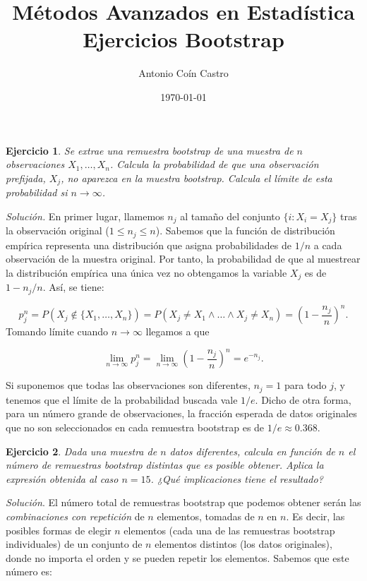 \documentclass[12pt]{article}
\title{Métodos Avanzados en Estadística \\ \Large{Ejercicios Bootstrap}}
\author{Antonio Coín Castro}
\date{\today}
\newtheorem{ejer}{Ejercicio}%
\begin{document}
\maketitle

\begin{ejer}
Se extrae una remuestra bootstrap de una muestra de $n$ observaciones $X_1,\dots,X_n$. Calcula la probabilidad de que una observación prefijada, $X_j$, no aparezca en la muestra bootstrap. Calcula el límite de esta probabilidad si $n\to \infty$.
\end{ejer}

\textit{Solución.} En primer lugar, llamemos $n_j$ al tamaño del conjunto $\{i: X_i = X_j\}$ tras la observación original ($1 \leq n_j \leq n$). Sabemos que la función de distribución empírica representa una distribución que asigna probabilidades de $1/n$ a cada observación de la muestra original. Por tanto, la probabilidad de que al muestrear la distribución empírica una única vez no obtengamos la variable $X_j$ es de $1- n_j/n$. Así, se tiene:

\[
p^n_j = P(X_j \notin \{X_1,\dots, X_n\}) = P(X_j \neq X_1 \land \dots \land X_j \neq X_n) = \left( 1 - \frac{n_j}{n}\right)^n.
\]
Tomando límite cuando $n\to\infty$ llegamos a que

\[
\lim_{n\to\infty} p^n_j = \lim_{n\to\infty}  \left( 1 - \frac{n_j}{n}\right)^n = e^{-n_j}.
\]

Si suponemos que todas las observaciones son diferentes, $n_j=1$ para todo $j$, y tenemos que el límite de la probabilidad buscada vale $1/e$. Dicho de otra forma, para un número grande de observaciones, la fracción esperada de datos originales que no son seleccionados en cada remuestra bootstrap es de $1/e \approx 0.368$.

\begin{ejer}
Dada una muestra de $n$ datos diferentes, calcula en función de $n$ el número de remuestras bootstrap distintas que es posible obtener. Aplica la expresión obtenida al caso $n=15$. ¿Qué implicaciones tiene el resultado?
\end{ejer}

\textit{Solución}. El número total de remuestras bootstrap que podemos obtener serán las \textit{combinaciones con repetición} de $n$ elementos, tomadas de $n$ en $n$. Es decir, las posibles formas de elegir $n$ elementos (cada una de las remuestras bootstrap individuales) de un conjunto de $n$ elementos distintos (los datos originales), donde no importa el orden y se pueden repetir los elementos. Sabemos que este número es:
\end{document}
